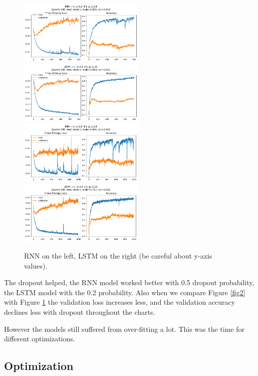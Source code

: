 \documentclass[a4paper,10pt]{article}
\begin{document}
\begin{figure}[H]
      \begin{center}
            \includegraphics[width=6cm]{figures/RNN--r-1--d-0.2--l-1--p-1114--e-500.png}
            \includegraphics[width=6cm]{figures/LSTM--r-1--d-0.2--l-1--p-1110--e-500.png}
            \includegraphics[width=6cm]{figures/RNN--r-1--d-0.5--l-1--p-1114--e-1000.png}
            \includegraphics[width=6cm]{figures/LSTM--r-1--d-0.5--l-1--p-1110--e-1000.png}
      \end{center}
      \caption{RNN on the left, LSTM on the right (be careful about y-axis values).}
      \label{fig3}
\end{figure}

The dropout helped, the RNN model worked better with 0.5 dropout probability, the LSTM model with the 0.2 probability.
Also when we compare Figure \ref{fig2} with Figure \ref{fig3} the validation loss increases less, and the validation accuracy declines less with dropout throughout the charts.

However the models still suffered from over-fitting a lot. This was the time for different optimizations.

\subsection{Optimization}
\end{document}

